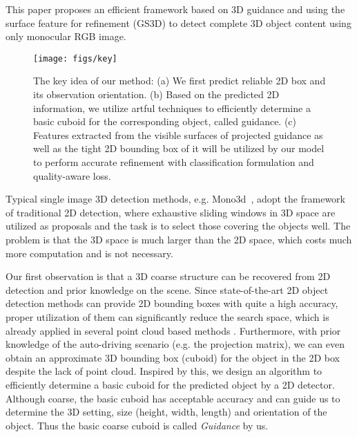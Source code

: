 \documentclass[10pt,twocolumn,letterpaper]{article}
\begin{document}
This paper proposes an efficient framework based on 3D guidance and using the surface feature for refinement (GS3D) to detect complete 3D object content using only monocular RGB image.


\begin{figure}[!ht]
\centering
\texttt{[image: figs/key]}
\caption{The key idea of our method: (a) We first predict reliable 2D box and its observation orientation. (b) Based on the predicted 2D information, we utilize artful techniques to efficiently determine a basic cuboid for the corresponding object, called guidance. (c) Features extracted from the visible surfaces of projected guidance as well as the tight 2D bounding box of it will be utilized by our model to perform accurate refinement with classification formulation and quality-aware loss.}
\label{fig:key}
\end{figure}

Typical single image 3D detection methods, e.g. Mono3d~\cite{mono3d}, adopt the framework of traditional 2D detection, where exhaustive sliding windows in 3D space are utilized as proposals and the task is to select those covering the objects well. The problem is that the 3D space is much larger than the 2D space, which costs much more computation and is not necessary.

Our first observation is that a 3D coarse structure can be recovered from 2D detection and prior knowledge on the scene. 
Since state-of-the-art 2D object detection methods can provide 2D bounding boxes with quite a high accuracy, proper utilization of them can significantly reduce the search space, which is already applied in several point cloud based methods \cite{fpointnet,avod}.
Furthermore, with prior knowledge of the auto-driving scenario (e.g. the projection matrix), we can even obtain an approximate 3D bounding box (cuboid) for the object in the 2D box despite the lack of point cloud.
Inspired by this, we design an algorithm to efficiently determine a basic cuboid for the predicted object by a 2D detector. 
Although coarse, the basic cuboid has acceptable accuracy and can guide us to determine the 3D setting, size (height, width, length) and orientation of the object.
Thus the basic coarse cuboid is called \textit{Guidance} by us.
\end{document}
